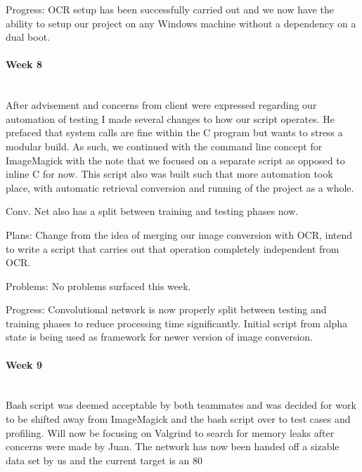 \documentclass[article, onecolumn, draftclsnofoot,10pt, compsoc]{IEEEtran}
\begin{document}
Progress:
OCR setup has been successfully carried out and we now have the ability to setup our project on any Windows machine without a dependency on a dual boot.

\paragraph{Week 8}
\mbox{}\\
After advisement and concerns from client were expressed regarding our automation of testing I made several changes to how our script operates. He prefaced that system calls are fine within the C program but wants to stress a modular build. As such, we continued with the command line concept for ImageMagick with the note that we focused on a separate script as opposed to inline C for now. This script also was built such that more automation took place, with automatic retrieval conversion and running of the project as a whole.
 
Conv. Net also has a split between training and testing phases now.
 
Plans:
Change from the idea of merging our image conversion with OCR, intend to write a script that carries out that operation completely independent from OCR.
 
Problems:
No problems surfaced this week.
 
Progress:
Convolutional network is now properly split between testing and training phases to reduce processing time significantly. Initial script from alpha state is being used as framework for newer version of image conversion.

\paragraph{Week 9}
\mbox{}\\
Bash script was deemed acceptable by both teammates and was decided for work to be shifted away from ImageMagick and the bash script over to test cases and profiling. Will now be focusing on Valgrind to search for memory leaks after concerns were made by Juan. The network has now been handed off a sizable data set by us and the current target is an 80%
 
\end{document}
